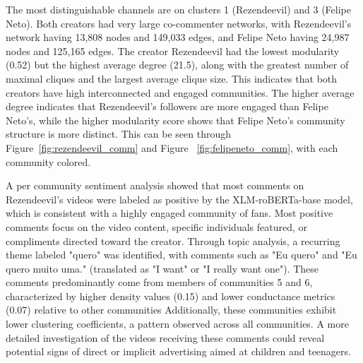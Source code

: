 \documentclass[sigconf]{acmart}
\begin{document}
The most distinguishable channels are on clusters 1 (Rezendeevil) and 3 (Felipe Neto). 
Both creators had very large co-commenter networks, with Rezendeevil's network having 13,808 
nodes and 149,033 edges, and Felipe Neto having 24,987 nodes and 125,165 edges.
The creator Rezendeevil had the lowest modularity (0.52) but the highest average degree (21.5), 
along with the greatest number of maximal cliques and the largest average clique size.
This indicates that both creators have high interconnected and engaged communities. The higher average
degree indicates that Rezendeevil's followers are more engaged than Felipe Neto's, while the higher
modularity score shows that Felipe Neto's community structure is more distinct.
This can be seen through Figure~\ref{fig:rezendeevil_comm} and Figure ~\ref{fig:felipeneto_comm}, 
with each community colored.

A per community sentiment analysis showed that most comments on Rezendeevil's videos were labeled as 
positive by the XLM-roBERTa-base model, which is consistent with a highly engaged community of fans.
Most positive comments focus on the video content, specific individuals featured, or compliments directed toward the creator. 
Through topic analysis, a recurring theme labeled 
"quero" was identified, with comments such as "Eu quero" and "Eu quero muito uma." 
(translated as "I want" or "I really want one").
These comments predominantly come from members of communities 5 and 6, characterized by higher density 
values (0.15) and lower conductance metrics (0.07) relative to other communities
Additionally, these communities exhibit lower clustering coefficients, a pattern observed across all communities.
A more detailed investigation of the videos receiving these comments could reveal potential 
signs of direct or implicit advertising aimed at children and teenagers.
\end{document}
